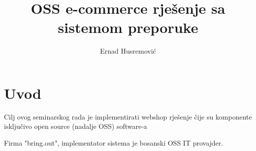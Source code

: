 \documentclass[times, utf8, seminar]{fit}
\begin{document}





\title{OSS e-commerce rješenje sa sistemom preporuke}

\author{Ernad Husremović}


\maketitle

\tableofcontents

\newpage

%
%


\chapter{Uvod}
\vspace*{-0.7cm}

Cilj ovog seminarskog rada je implementirati webshop rješenje čije su komponente isključivo open source (nadalje OSS) software-a 

Firma "bring.out", implementator sistema je bosanski OSS IT provajder.
\end{document}
